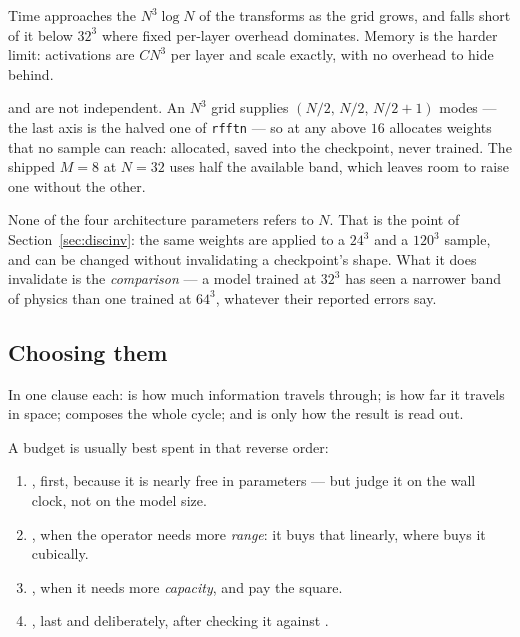 Time approaches the $N^3\log N$ of the transforms as the grid grows, and falls
short of it below $32^3$ where fixed per-layer overhead dominates. Memory is
the harder limit: activations are $C N^3$ per layer and scale exactly, with no
overhead to hide behind.

\begin{pwarn}
 and  are not independent. An $N^3$ grid supplies
$(N/2,\, N/2,\, N/2+1)$ modes --- the last axis is the halved one of
\texttt{rfftn} --- so at  any  above $16$
allocates weights that no sample can reach: allocated, saved into the
checkpoint, never trained. The shipped $M=8$ at $N=32$ uses half the available
band, which leaves room to raise one without the other.
\end{pwarn}

\begin{pnote}
None of the four architecture parameters refers to $N$. That is the point of
Section~\ref{sec:discinv}: the same weights are applied to a $24^3$ and a
$120^3$ sample, and  can be changed without invalidating a
checkpoint's shape. What it does invalidate is the \emph{comparison} --- a
model trained at $32^3$ has seen a narrower band of physics than one trained at
$64^3$, whatever their reported errors say.
\end{pnote}

\subsection{Choosing them}

In one clause each:  is how much information travels through;
 is how far it travels in space;  composes the whole
cycle; and  is only how the result is read out.

A budget is usually best spent in that reverse order:

\begin{enumerate}
  \item {}, first, because it is nearly free in
    parameters --- but judge it on the wall clock, not on the model size.
  \item {}, when the operator needs more \emph{range}: it buys
    that linearly, where  buys it cubically.
  \item {}, when it needs more \emph{capacity}, and pay the square.
  \item {}, last and deliberately, after checking it against
    .
\end{enumerate}
